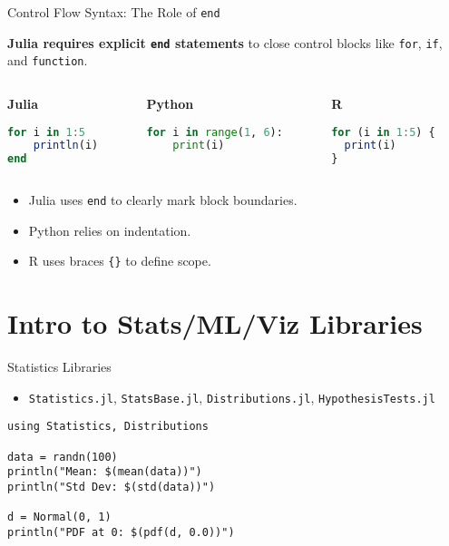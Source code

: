 \documentclass{beamer}
\begin{document}
\begin{frame}[fragile]{Control Flow Syntax: The Role of \texttt{end}}

\textbf{Julia requires explicit \texttt{end} statements} to close control blocks like \texttt{for}, \texttt{if}, and \texttt{function}.

\vspace{0.4cm}
\begin{columns}[t]
    \begin{column}{0.33\textwidth}
    \textbf{Julia}
\begin{lstlisting}[language=Julia]
for i in 1:5
    println(i)
end
\end{lstlisting}
    \end{column}

    \begin{column}{0.33\textwidth}
    \textbf{Python}
\begin{lstlisting}[language=Python]
for i in range(1, 6):
    print(i)
\end{lstlisting}
    \end{column}

    \begin{column}{0.33\textwidth}
    \textbf{R}
\begin{lstlisting}[language=R]
for (i in 1:5) {
  print(i)
}
\end{lstlisting}
    \end{column}
\end{columns}

\vspace{0.3cm}
\begin{itemize}
    \item Julia uses \texttt{end} to clearly mark block boundaries.
    \item Python relies on indentation.
    \item R uses braces \texttt{\{\}} to define scope.
\end{itemize}

\end{frame}




\section{Intro to Stats/ML/Viz Libraries}

\begin{frame}[fragile]{Statistics Libraries}
\begin{itemize}
    \item \texttt{Statistics.jl}, \texttt{StatsBase.jl}, \texttt{Distributions.jl}, \texttt{HypothesisTests.jl}
\end{itemize}
\begin{lstlisting}
using Statistics, Distributions

data = randn(100)
println("Mean: $(mean(data))")
println("Std Dev: $(std(data))")

d = Normal(0, 1)
println("PDF at 0: $(pdf(d, 0.0))")
\end{lstlisting}
\end{frame}
\end{document}
